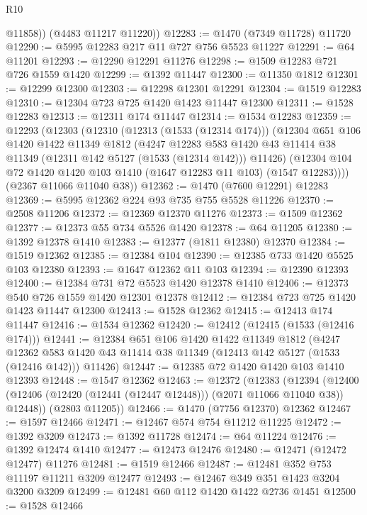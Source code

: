 \begin{lexlean}{R10}
\begin{coremodule}
          @11858))
      (@4483 @11217 @11220))
@12283 := @1470 (@7349 @11728) @11720
@12290 := @5995 @12283 @217 @11 @727 @756 @5523 @11227
@12291 := @64 @11201
@12293 := @12290 @12291 @11276
@12298 := @1509 @12283 @721 @726 @1559 @1420
@12299 := @1392 @11447
@12300 := @11350 @1812
@12301 := @12299 @12300
@12303 := @12298 @12301 @12291
@12304 := @1519 @12283
@12310 := @12304 @723 @725 @1420 @1423 @11447 @12300
@12311 := @1528 @12283
@12313 := @12311 @174 @11447
@12314 := @1534 @12283
@12359 := @12293
    (@12303
      (@12310
        (@12313 (@1533 (@12314 @174)))
        (@12304
          @651
          @106
          @1420
          @1422
          @11349
          @1812
          (@4247
            @12283
            @583
            @1420
            @43
            @11414
            @38
            @11349
            (@12311 @142 @5127 (@1533 (@12314 @142)))
            @11426)
          (@12304 @104 @72 @1420 @1420 @103 @1410 (@1647 @12283 @11 @103) (@1547 @12283))))
      (@2367 @11066 @11040 @38))
@12362 := @1470 (@7600 @12291) @12283
@12369 := @5995 @12362 @224 @93 @735 @755 @5528 @11226
@12370 := @2508 @11206
@12372 := @12369 @12370 @11276
@12373 := @1509 @12362
@12377 := @12373 @55 @734 @5526 @1420
@12378 := @64 @11205
@12380 := @1392 @12378 @1410
@12383 := @12377 (@1811 @12380) @12370
@12384 := @1519 @12362
@12385 := @12384 @104
@12390 := @12385 @733 @1420 @5525 @103 @12380
@12393 := @1647 @12362 @11 @103
@12394 := @12390 @12393
@12400 := @12384 @731 @72 @5523 @1420 @12378 @1410
@12406 := @12373 @540 @726 @1559 @1420 @12301 @12378
@12412 := @12384 @723 @725 @1420 @1423 @11447 @12300
@12413 := @1528 @12362
@12415 := @12413 @174 @11447
@12416 := @1534 @12362
@12420 := @12412 (@12415 (@1533 (@12416 @174)))
@12441 := @12384
    @651
    @106
    @1420
    @1422
    @11349
    @1812
    (@4247 @12362 @583 @1420 @43 @11414 @38 @11349 (@12413 @142 @5127 (@1533 (@12416 @142))) @11426)
@12447 := @12385 @72 @1420 @1420 @103 @1410 @12393
@12448 := @1547 @12362
@12463 := @12372
    (@12383
      (@12394 (@12400 (@12406 (@12420 (@12441 (@12447 @12448))) (@2071 @11066 @11040 @38)) @12448))
      (@2803 @11205))
@12466 := @1470 (@7756 @12370) @12362
@12467 := @1597 @12466
@12471 := @12467 @574 @754 @11212 @11225
@12472 := @1392 @3209
@12473 := @1392 @11728
@12474 := @64 @11224
@12476 := @1392 @12474 @1410
@12477 := @12473 @12476
@12480 := @12471 (@12472 @12477) @11276
@12481 := @1519 @12466
@12487 := @12481 @352 @753 @11197 @11211 @3209 @12477
@12493 := @12467 @349 @351 @1423 @3204 @3200 @3209
@12499 := @12481 @60 @112 @1420 @1422 @2736 @1451
@12500 := @1528 @12466

\end{coremodule}
\end{lexlean}
